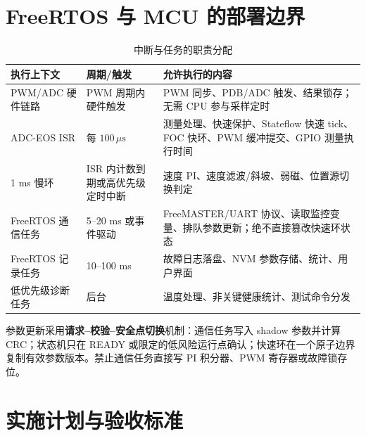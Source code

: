 \documentclass[UTF8,a4paper,11pt,fontset=windows]{ctexart}
\begin{document}
\section{FreeRTOS 与 MCU 的部署边界}
\begin{table}[htbp]
\centering
\caption{中断与任务的职责分配}
\begin{tabularx}{\textwidth}{p{}p{}Y}
\toprule
执行上下文 & 周期/触发 & 允许执行的内容 \\
\midrule
PWM/ADC 硬件链路 & PWM 周期内硬件触发 & PWM 同步、PDB/ADC 触发、结果锁存；无需 CPU 参与采样定时 \\
ADC-EOS ISR & 每 $100\,\mu\mathrm{s}$ & 测量处理、快速保护、Stateflow 快速 tick、FOC 快环、PWM 缓冲提交、GPIO 测量执行时间 \\
1 ms 慢环 & ISR 内计数到期或高优先级定时中断 & 速度 PI、速度滤波/斜坡、弱磁、位置源切换判定 \\
FreeRTOS 通信任务 & 5--20 ms 或事件驱动 & FreeMASTER/UART 协议、读取监控变量、排队参数更新；绝不直接篡改快速环状态 \\
FreeRTOS 记录任务 & 10--100 ms & 故障日志落盘、NVM 参数存储、统计、用户界面 \\
低优先级诊断任务 & 后台 & 温度处理、非关键健康统计、测试命令分发 \\
\bottomrule
\end{tabularx}
\end{table}
参数更新采用\textbf{请求--校验--安全点切换}机制：通信任务写入 shadow 参数并计算 CRC；状态机只在 READY 或限定的低风险运行点确认；快速环在一个原子边界复制有效参数版本。禁止通信任务直接写 PI 积分器、PWM 寄存器或故障锁存位。
\section{实施计划与验收标准}
\end{document}
